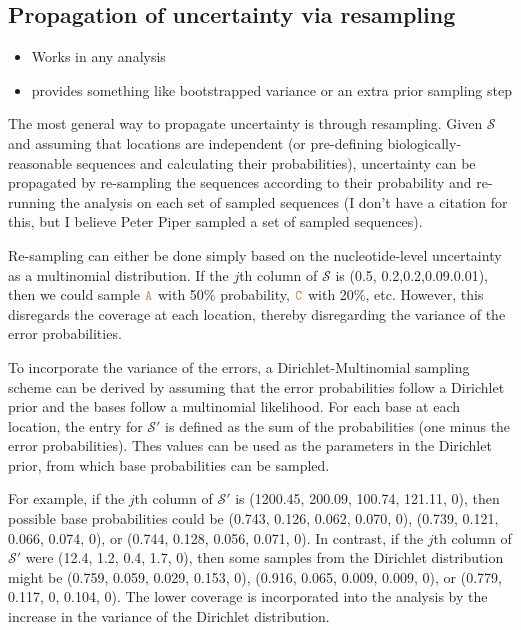 \documentclass[
]{article}
\providecommand{\tightlist}{%
  \setlength{\itemsep}{0pt}\setlength{\parskip}{0pt}}
\newcommand{\sq}[1]{\texttt{\textcolor{brown}{#1}}}
\newcommand{\nps}{\mathcal{S}} %
\begin{document}
\hypertarget{propagation-of-uncertainty-via-resampling}{%
\subsection{Propagation of uncertainty via
resampling}\label{propagation-of-uncertainty-via-resampling}}

\begin{itemize}
\tightlist
\item
  Works in any analysis
\item
  provides something like bootstrapped variance or an extra prior
  sampling step
\end{itemize}

The most general way to propagate uncertainty is through resampling.
Given \(\nps\) and assuming that locations are independent (or
pre-defining biologically-reasonable sequences and calculating their
probabilities), uncertainty can be propagated by re-sampling the
sequences according to their probability and re-running the analysis on
each set of sampled sequences (I don't have a citation for this, but I
believe Peter Piper sampled a set of sampled sequences).

Re-sampling can either be done simply based on the nucleotide-level
uncertainty as a multinomial distribution. If the \(j\)th column of
\(\nps\) is (0.5, 0.2,0.2,0.09.0.01), then we could sample \(\sq{A}\)
with 50\% probability, \(\sq{C}\) with 20\%, etc. However, this
disregards the coverage at each location, thereby disregarding the
variance of the error probabilities.

To incorporate the variance of the errors, a Dirichlet-Multinomial
sampling scheme can be derived by assuming that the error probabilities
follow a Dirichlet prior and the bases follow a multinomial likelihood.
For each base at each location, the entry for \(\nps'\) is defined as
the sum of the probabilities (one minus the error probabilities). Thes
values can be used as the parameters in the Dirichlet prior, from which
base probabilities can be sampled.

For example, if the \(j\)th column of \(\nps'\) is (1200.45, 200.09,
100.74, 121.11, 0), then possible base probabilities could be (0.743,
0.126, 0.062, 0.070, 0), (0.739, 0.121, 0.066, 0.074, 0), or (0.744,
0.128, 0.056, 0.071, 0). In contrast, if the \(j\)th column of \(\nps'\)
were (12.4, 1.2, 0.4, 1.7, 0), then some samples from the Dirichlet
distribution might be (0.759, 0.059, 0.029, 0.153, 0), (0.916, 0.065,
0.009, 0.009, 0), or (0.779, 0.117, 0, 0.104, 0). The lower coverage is
incorporated into the analysis by the increase in the variance of the
Dirichlet distribution.
\end{document}
